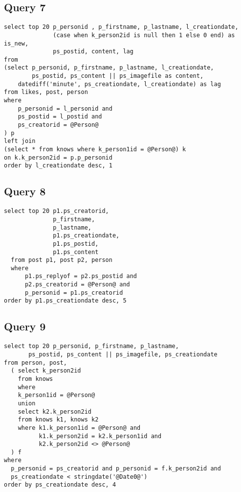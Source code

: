 \subsection{Query 7}
\begin{verbatim}
select top 20 p_personid , p_firstname, p_lastname, l_creationdate,
              (case when k_person2id is null then 1 else 0 end) as is_new,
              ps_postid, content, lag
from
(select p_personid, p_firstname, p_lastname, l_creationdate,
        ps_postid, ps_content || ps_imagefile as content,
    datediff('minute', ps_creationdate, l_creationdate) as lag
from likes, post, person
where
    p_personid = l_personid and
    ps_postid = l_postid and
    ps_creatorid = @Person@
) p
left join
(select * from knows where k_person1id = @Person@) k
on k.k_person2id = p.p_personid
order by l_creationdate desc, 1
\end{verbatim}
 

\subsection{Query 8}
\begin{verbatim}
select top 20 p1.ps_creatorid, 
              p_firstname, 
              p_lastname, 
              p1.ps_creationdate, 
              p1.ps_postid, 
              p1.ps_content
  from post p1, post p2, person
  where
      p1.ps_replyof = p2.ps_postid and
      p2.ps_creatorid = @Person@ and
      p_personid = p1.ps_creatorid
order by p1.ps_creationdate desc, 5
\end{verbatim}



\subsection{Query 9}
\begin{verbatim}
select top 20 p_personid, p_firstname, p_lastname,
       ps_postid, ps_content || ps_imagefile, ps_creationdate
from person, post,
  ( select k_person2id
    from knows
    where
    k_person1id = @Person@
    union
    select k2.k_person2id
    from knows k1, knows k2
    where k1.k_person1id = @Person@ and
          k1.k_person2id = k2.k_person1id and 
          k2.k_person2id <> @Person@
  ) f
where
  p_personid = ps_creatorid and p_personid = f.k_person2id and
  ps_creationdate < stringdate('@Date0@')
order by ps_creationdate desc, 4
\end{verbatim}
 


